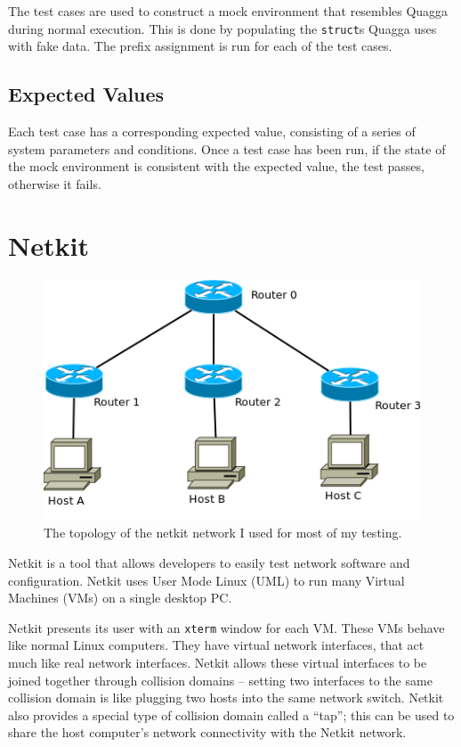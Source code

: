 The test cases are used to construct a mock environment that resembles
Quagga during normal execution. This is done by populating the \texttt{struct}s
Quagga uses with fake data. The prefix assignment is run for each of the test
cases. 

\subsection{Expected Values}
Each test case has a corresponding expected value, consisting of a
series of system parameters and conditions. Once a test case has been run, if
the state of the mock environment is consistent with the expected value, the
test passes, otherwise it fails. 

\section{Netkit} 
\begin{figure}
\begin{center}
	\includegraphics[width=\linewidth]{../Diagrams/Network/MainNetkit.png}
	\caption{The topology of the netkit network I used for most of my testing.}
	\label{fig:NetkitTopology}
\end{center}
\end{figure}
Netkit is a tool that allows developers to easily test network software and
configuration. Netkit uses User Mode Linux (UML)  to run many Virtual Machines (VMs) 
on a single desktop PC. 

Netkit presents its user with an \texttt{xterm} window for each VM\@. These VMs
behave like normal Linux computers. They have virtual network interfaces, that
act much like real network interfaces. Netkit allows these virtual interfaces
to be joined together through collision domains -- setting two interfaces to
the same collision domain is like plugging two hosts into the same network
switch.  Netkit also provides a special type of collision domain called a
``tap''; this can be used to share the host computer's network connectivity
with the Netkit network.

